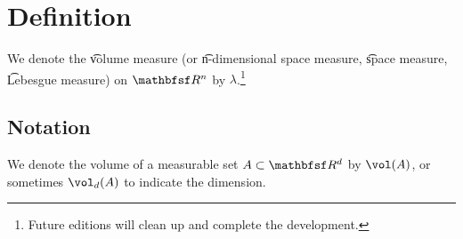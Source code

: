 
\section*{Definition}

We denote the \t{volume measure} (or \t{n-dimensional space measure}, \t{space measure}, \t{Lebesgue measure}) on $\R ^n$ by $\lambda $.\footnote{Future editions will clean up and complete the development.}

\subsection*{Notation}

We denote the volume of a measurable set $A \subset \R ^d$ by $\vol(A)$, or sometimes $\vol_d(A)$ to indicate the dimension.

\blankpage